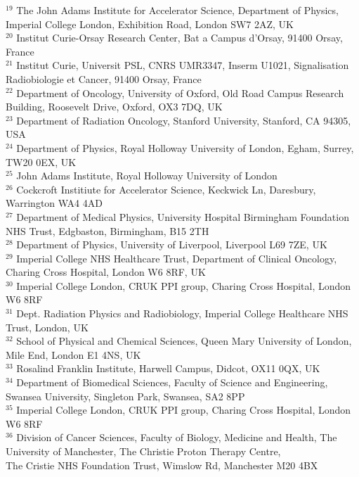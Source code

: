 {\begin{tabbing}
     $^{19}$ \> The John Adams Institute for Accelerator Science, Department of Physics, Imperial College London, Exhibition Road, London SW7 2AZ, UK\\
     $^{20}$ \> Institut Curie-Orsay Research Center, Bat a Campus d'Orsay, 91400 Orsay, France\\
     $^{21}$ \> Institut Curie, Universit PSL, CNRS UMR3347, Inserm U1021, Signalisation Radiobiologie et Cancer, 91400 Orsay, France\\
     $^{22}$ \> Department of Oncology, University of Oxford, Old Road Campus Research Building, Roosevelt Drive, Oxford, OX3 7DQ, UK\\
     $^{23}$ \> Department of Radiation Oncology, Stanford University, Stanford, CA 94305, USA\\
     $^{24}$ \> Department of Physics, Royal Holloway University of London, Egham, Surrey, TW20 0EX, UK\\
     $^{25}$ \> John Adams Institute, Royal Holloway University of London\\
     $^{26}$ \> Cockcroft Institiute for Accelerator Science, Keckwick Ln, Daresbury, Warrington WA4 4AD\\
     $^{27}$ \> Department of Medical Physics, University Hospital Birmingham Foundation NHS Trust, Edgbaston, Birmingham, B15 2TH\\
     $^{28}$ \> Department of Physics, University of Liverpool, Liverpool L69 7ZE, UK\\
     $^{29}$ \> Imperial College NHS Healthcare Trust, Department of Clinical Oncology, Charing Cross Hospital, London W6 8RF, UK\\
     $^{30}$ \> Imperial College London, CRUK PPI group, Charing Cross Hospital, London W6 8RF\\
     $^{31}$ \> Dept. Radiation Physics and Radiobiology, Imperial College Healthcare NHS Trust, London, UK\\
     $^{32}$ \> School of Physical and Chemical Sciences, Queen Mary University of London, Mile End, London E1 4NS, UK\\
     $^{33}$ \> Rosalind Franklin Institute, Harwell Campus, Didcot, OX11 0QX, UK\\
     $^{34}$ \> Department of Biomedical Sciences, Faculty of Science and Engineering, Swansea University, Singleton Park, Swansea, SA2 8PP\\
     $^{35}$ \> Imperial College London, CRUK PPI group, Charing Cross Hospital, London W6 8RF\\
     $^{36}$ \> Division of Cancer Sciences, Faculty of Biology, Medicine and Health, The University of Manchester, The Christie Proton Therapy Centre, \\ \> The Cristie NHS Foundation Trust, Wimslow Rd, Manchester M20 4BX\\

\end{tabbing}}
